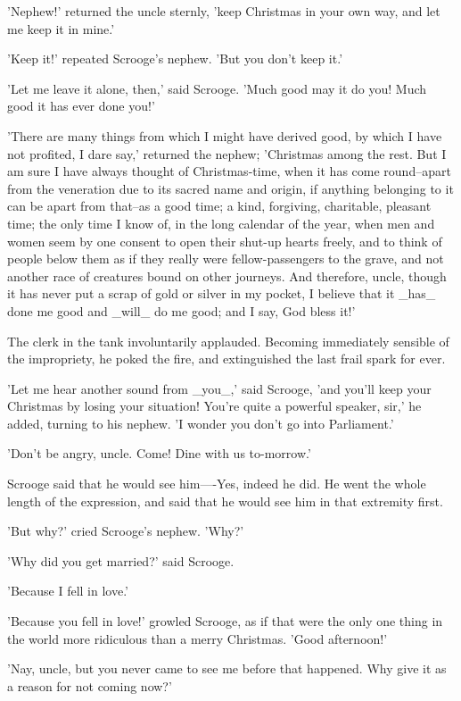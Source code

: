 'Nephew!' returned the uncle sternly, 'keep Christmas in your own way,
and let me keep it in mine.'

'Keep it!' repeated Scrooge's nephew. 'But you don't keep it.'

'Let me leave it alone, then,' said Scrooge. 'Much good may it do you!
Much good it has ever done you!'

'There are many things from which I might have derived good, by which I
have not profited, I dare say,' returned the nephew; 'Christmas among
the rest. But I am sure I have always thought of Christmas-time, when
it has come round--apart from the veneration due to its sacred name and
origin, if anything belonging to it can be apart from that--as a good
time; a kind, forgiving, charitable, pleasant time; the only time I know
of, in the long calendar of the year, when men and women seem by one
consent to open their shut-up hearts freely, and to think of people
below them as if they really were fellow-passengers to the grave, and
not another race of creatures bound on other journeys. And therefore,
uncle, though it has never put a scrap of gold or silver in my pocket, I
believe that it _has_ done me good and _will_ do me good; and I say, God
bless it!'

The clerk in the tank involuntarily applauded. Becoming immediately
sensible of the impropriety, he poked the fire, and extinguished the
last frail spark for ever.

'Let me hear another sound from _you_,' said Scrooge, 'and you'll keep
your Christmas by losing your situation! You're quite a powerful
speaker, sir,' he added, turning to his nephew. 'I wonder you don't go
into Parliament.'

'Don't be angry, uncle. Come! Dine with us to-morrow.'

Scrooge said that he would see him----Yes, indeed he did. He went the
whole length of the expression, and said that he would see him in that
extremity first.

'But why?' cried Scrooge's nephew. 'Why?'

'Why did you get married?' said Scrooge.

'Because I fell in love.'

'Because you fell in love!' growled Scrooge, as if that were the only
one thing in the world more ridiculous than a merry Christmas. 'Good
afternoon!'

'Nay, uncle, but you never came to see me before that happened. Why give
it as a reason for not coming now?'

